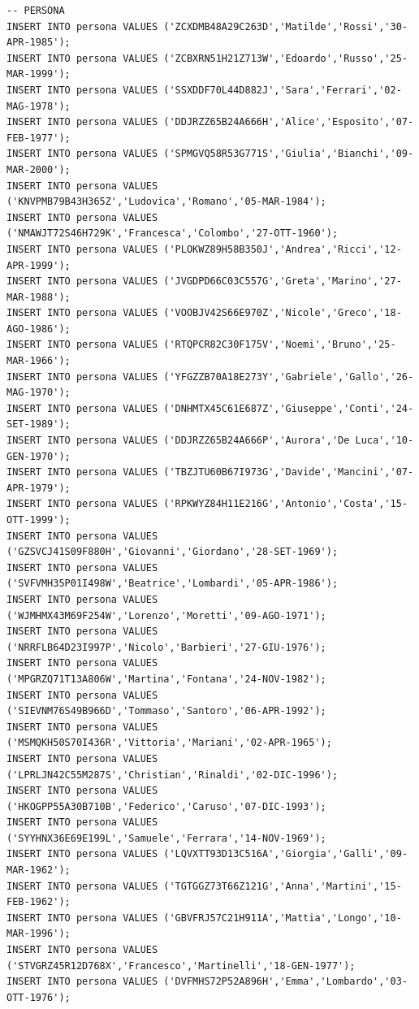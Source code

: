 \documentclass[12pt]{report}
\begin{document}
\begin{scriptsize}
\begin{verbatim}
-- PERSONA
INSERT INTO persona VALUES ('ZCXDMB48A29C263D','Matilde','Rossi','30-APR-1985');
INSERT INTO persona VALUES ('ZCBXRN51H21Z713W','Edoardo','Russo','25-MAR-1999');
INSERT INTO persona VALUES ('SSXDDF70L44D882J','Sara','Ferrari','02-MAG-1978');
INSERT INTO persona VALUES ('DDJRZZ65B24A666H','Alice','Esposito','07-FEB-1977');
INSERT INTO persona VALUES ('SPMGVQ58R53G771S','Giulia','Bianchi','09-MAR-2000');
INSERT INTO persona VALUES ('KNVPMB79B43H365Z','Ludovica','Romano','05-MAR-1984');
INSERT INTO persona VALUES ('NMAWJT72S46H729K','Francesca','Colombo','27-OTT-1960');
INSERT INTO persona VALUES ('PLOKWZ89H58B350J','Andrea','Ricci','12-APR-1999');
INSERT INTO persona VALUES ('JVGDPD66C03C557G','Greta','Marino','27-MAR-1988');
INSERT INTO persona VALUES ('VOOBJV42S66E970Z','Nicole','Greco','18-AGO-1986');
INSERT INTO persona VALUES ('RTQPCR82C30F175V','Noemi','Bruno','25-MAR-1966');
INSERT INTO persona VALUES ('YFGZZB70A18E273Y','Gabriele','Gallo','26-MAG-1970');
INSERT INTO persona VALUES ('DNHMTX45C61E687Z','Giuseppe','Conti','24-SET-1989');
INSERT INTO persona VALUES ('DDJRZZ65B24A666P','Aurora','De Luca','10-GEN-1970');
INSERT INTO persona VALUES ('TBZJTU60B67I973G','Davide','Mancini','07-APR-1979');
INSERT INTO persona VALUES ('RPKWYZ84H11E216G','Antonio','Costa','15-OTT-1999');
INSERT INTO persona VALUES ('GZSVCJ41S09F880H','Giovanni','Giordano','28-SET-1969');
INSERT INTO persona VALUES ('SVFVMH35P01I498W','Beatrice','Lombardi','05-APR-1986');
INSERT INTO persona VALUES ('WJMHMX43M69F254W','Lorenzo','Moretti','09-AGO-1971');
INSERT INTO persona VALUES ('NRRFLB64D23I997P','Nicolo','Barbieri','27-GIU-1976');
INSERT INTO persona VALUES ('MPGRZQ71T13A806W','Martina','Fontana','24-NOV-1982');
INSERT INTO persona VALUES ('SIEVNM76S49B966D','Tommaso','Santoro','06-APR-1992');
INSERT INTO persona VALUES ('MSMQKH50S70I436R','Vittoria','Mariani','02-APR-1965');
INSERT INTO persona VALUES ('LPRLJN42C55M287S','Christian','Rinaldi','02-DIC-1996');
INSERT INTO persona VALUES ('HKOGPP55A30B710B','Federico','Caruso','07-DIC-1993');
INSERT INTO persona VALUES ('SYYHNX36E69E199L','Samuele','Ferrara','14-NOV-1969');
INSERT INTO persona VALUES ('LQVXTT93D13C516A','Giorgia','Galli','09-MAR-1962');
INSERT INTO persona VALUES ('TGTGGZ73T66Z121G','Anna','Martini','15-FEB-1962');
INSERT INTO persona VALUES ('GBVFRJ57C21H911A','Mattia','Longo','10-MAR-1996');
INSERT INTO persona VALUES ('STVGRZ45R12D768X','Francesco','Martinelli','18-GEN-1977');
INSERT INTO persona VALUES ('DVFMHS72P52A896H','Emma','Lombardo','03-OTT-1976');

\end{verbatim}
\end{scriptsize}
\end{document}

